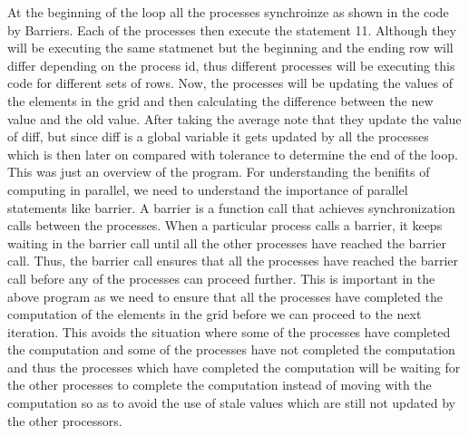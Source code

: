 \documentclass[12pt]{article}
\begin{document}
At the beginning of the loop all the processes synchroinze as shown in the code by Barriers.
Each of the processes then execute the statement 11. Although they will be executing the same statmenet but the beginning and the ending row will differ depending 
on the process id, thus different processes will be executing this code for different sets of rows.
Now, the processes will be updating the values of the elements in the grid and then calculating the difference between the new value and the old value. After taking the average note that they 
update the value of diff, but since diff is a global variable it gets updated by all the processes which is then later on compared with tolerance to determine the end of the loop.
This was just an overview of the program. For understanding the benifits of computing in parallel, we need to understand the importance of parallel statements like barrier.
A barrier is a function call that achieves synchronization calls between the processes. When a particular process calls a barrier, it keeps waiting in the barrier call until all the other processes have reached the barrier call.
Thus, the barrier call ensures that all the processes have reached the barrier call before any of the processes can proceed further. This is important in the above program as we need to ensure that all the processes have completed the computation of the elements in the grid before we can proceed to the next iteration.
This avoids the situation where some of the processes have completed the computation and some of the processes have not completed the computation and thus the processes which have completed the computation will be waiting for the other processes to complete the computation
instead of moving with the computation so as to avoid the use of stale values which are still not updated by the other processors.
\end{document}
